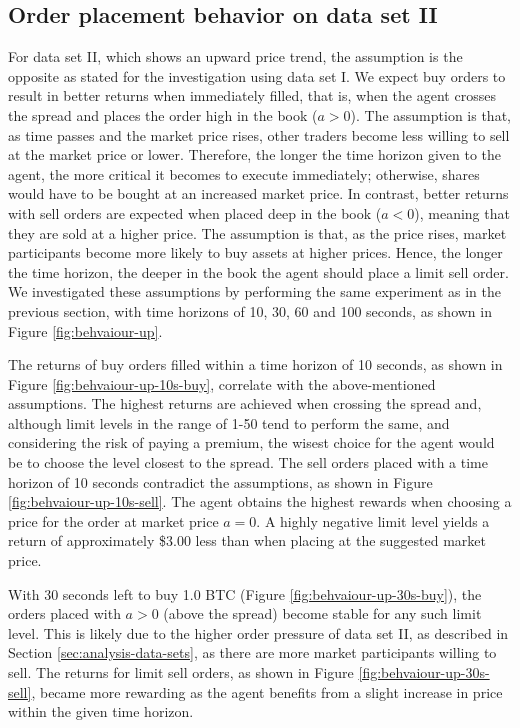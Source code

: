 \subsection{Order placement behavior on data set II}
For data set II, which shows an upward price trend, the assumption is the opposite as stated for the investigation using data set I.
We expect buy orders to result in better returns when immediately filled, that is, when the agent crosses the spread and places the order high in the book ($a>0$).
The assumption is that, as time passes and the market price rises, other traders become less willing to sell at the market price or lower.
Therefore, the longer the time horizon given to the agent, the more critical it becomes to execute immediately;  otherwise, shares would have to be bought at an increased market price.
In contrast, better returns with sell orders are expected when placed deep in the book ($a<0$), meaning that they are sold at a higher price.
The assumption is that, as the price rises, market participants become more likely to buy assets at higher prices.
Hence, the longer the time horizon, the deeper in the book the agent should place a limit sell order.
We investigated these assumptions by performing the same experiment as in the previous section, with time horizons of 10, 30, 60 and 100 seconds, as shown in Figure \ref{fig:behvaiour-up}.

The returns of buy orders filled within a time horizon of 10 seconds, as shown in Figure \ref{fig:behvaiour-up-10s-buy}, correlate with the above-mentioned assumptions.
The highest returns are achieved when crossing the spread and, although limit levels in the range of 1-50 tend to perform the same, and considering the risk of paying a premium, the wisest choice for the agent would be to choose the level closest to the spread.
The sell orders placed with a time horizon of 10 seconds contradict the assumptions, as shown in Figure \ref{fig:behvaiour-up-10s-sell}.
The agent obtains the highest rewards when choosing a price for the order at market price $a=0$.
A highly negative limit level yields a return of  approximately \$3.00 less than when placing at the suggested market price.

With 30 seconds left to buy 1.0 BTC (Figure \ref{fig:behvaiour-up-30s-buy}), the orders placed with $a>0$ (above the spread) become stable for any such limit level.
This is likely due to the higher order pressure of data set II, as described in Section \ref{sec:analysis-data-sets}, as there are more market participants willing to sell.
The returns for limit sell orders, as shown in Figure \ref{fig:behvaiour-up-30s-sell}, became more rewarding as the agent benefits from a slight increase in price within the given time horizon.

